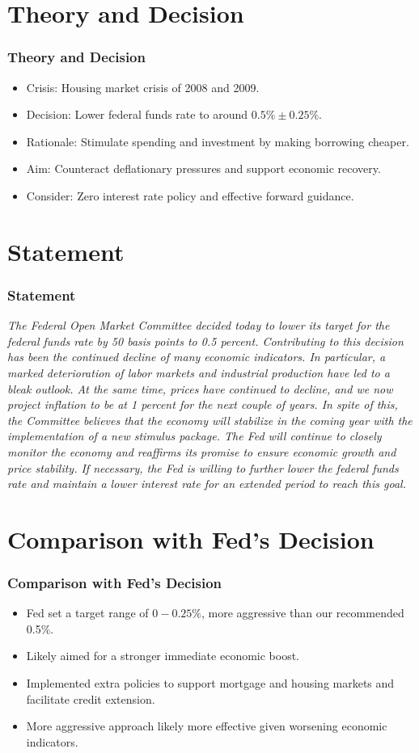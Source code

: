 \documentclass{beamer}
\begin{document}
\section{Theory and Decision}
\begin{frame}
    \frametitle{Theory and Decision}
    \begin{itemize}
        \item Crisis: Housing market crisis of 2008 and 2009.
        \item Decision: Lower federal funds rate to around \(0.5\% \pm 0.25\% \).
        \item Rationale: Stimulate spending and investment by making borrowing cheaper.
        \item Aim: Counteract deflationary pressures and support economic recovery.
        \item Consider: Zero interest rate policy and effective forward guidance.
    \end{itemize}
\end{frame}

\section{Statement}
\begin{frame}
    \frametitle{Statement}
    \textit{The Federal Open Market Committee decided today to lower its target for the federal funds rate by 50 basis points to 0.5 percent. Contributing to this decision has been the continued decline of many economic indicators. In particular, a marked deterioration of labor markets and industrial production have led to a bleak outlook. At the same time, prices have continued to decline, and we now project inflation to be at 1 percent for the next couple of years. In spite of this, the Committee believes that the economy will stabilize in the coming year with the implementation of a new stimulus package. The Fed will continue to closely monitor the economy and reaffirms its promise to ensure economic growth and price stability. If necessary, the Fed is willing to further lower the federal funds rate and maintain a lower interest rate for an extended period to reach this goal.}
\end{frame}

\section{Comparison with Fed's Decision}
\begin{frame}
    \frametitle{Comparison with Fed's Decision}
    \begin{itemize}
        \item Fed set a target range of \(0-0.25\%\), more aggressive than our recommended 0.5\%.
        \item Likely aimed for a stronger immediate economic boost.
        \item Implemented extra policies to support mortgage and housing markets and facilitate credit extension.
        \item More aggressive approach likely more effective given worsening economic indicators.
    \end{itemize}
\end{frame}
\end{document}
